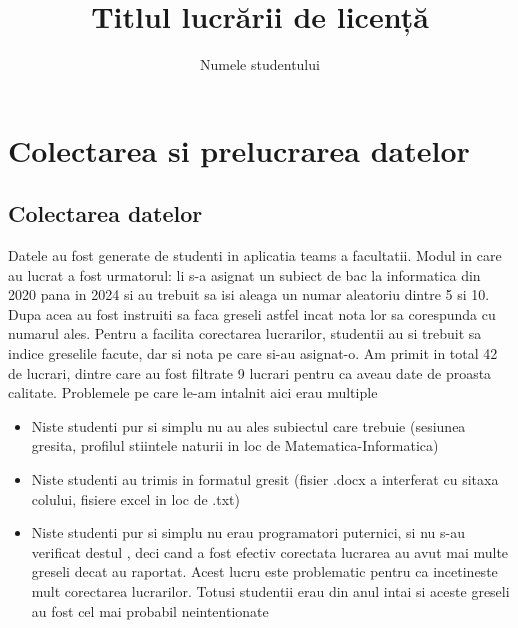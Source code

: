 \documentclass[12pt, a4paper]{report}
\title{Titlul lucrării de licență}
\author{Numele studentului}
\begin{document}
\cleardoublepage
\let\ps@plain


\restoregeometry
{}


\addtocounter{page}{1}



\tableofcontents

\cleardoublepage
\pagestyle{main}
\let\ps@plain\ps@main



\chapter{Colectarea si prelucrarea datelor}
\section{Colectarea datelor}
Datele au fost generate de studenti in aplicatia teams a facultatii. Modul in care au lucrat a fost urmatorul: li s-a asignat un subiect de bac la informatica din 2020 pana in 2024
si au trebuit sa isi aleaga un numar aleatoriu dintre 5 si 10. Dupa acea au fost instruiti sa faca greseli astfel incat nota lor sa corespunda cu numarul ales.
Pentru a facilita corectarea lucrarilor, studentii au si trebuit sa indice greselile facute, dar si nota pe care si-au asignat-o.
Am primit in total 42 de lucrari, dintre care au fost filtrate 9 lucrari pentru ca aveau date de proasta calitate.
Problemele pe care le-am intalnit aici erau multiple
\begin{itemize}
  \item Niste studenti pur si simplu nu au ales subiectul care trebuie (sesiunea gresita, profilul stiintele naturii in loc de Matematica-Informatica)
  \item Niste studenti au trimis in formatul gresit (fisier .docx a interferat cu sitaxa colului, fisiere excel in loc de .txt)
  \item Niste studenti pur si simplu nu erau programatori puternici, si nu s-au verificat destul , deci cand a fost efectiv corectata lucrarea au
  avut mai multe greseli decat au raportat. Acest lucru este problematic pentru ca incetineste mult corectarea lucrarilor. Totusi studentii erau din anul intai si aceste greseli au fost cel mai probabil neintentionate


\end{itemize} 
\end{document}
